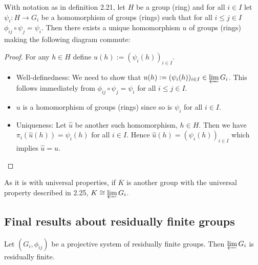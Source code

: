 \begin{theorem}
With notation as in definition 2.21, let $H$ be a group (ring) and for all $i \in I$ let $\psi_i: H \rightarrow G_i$ be a homomorphism of groups (rings) such that for all $i \leq j \in I$ $\phi_{ij} \circ \psi_j = \psi_i$. Then there exists a unique homomorphism $u$ of groups (rings) making the following diagram commute: \newline
\begin{center}
\end{center}

\end{theorem}

\begin{proof}
For any $h \in H$ define $u(h) := ( \psi_i(h))_{i \in I}$. \newline
\begin{itemize}
\item Well-definedness: We need to show that $u(h):= ( \psi_i(h))_{i \in I} \in \varprojlim G_i$. This follows immediately from  $\phi_{ij} \circ \psi_j  = \psi_i$ for all $i \leq j \in I$.
\item $u$ is a homomorphism of groups (rings) since so is $\psi_i$ for all $i \in I$.
\item Uniqueness: Let $\hat{u}$ be another such homomorphism, $h \in H$. Then we have $\pi_i (\hat{u} (h)) = \psi_i (h)$ for all $i \in I$. Hence $\hat{u} (h) = (\psi_i (h))_{i \in I}$ which implies $\hat{u} = u$.
\end{itemize}
\end{proof}

As it is with universal properties, if $K$ is another group with the universal property described in 2.25, $K \cong \varprojlim G_i$. 

\subsection{Final results about residually finite groups} 

\begin{corollary}
Let $(G_i, \phi_{ij} )$ be a projective system of residually finite groups. Then $\varprojlim G_i$ is residually finite.
\end{corollary}

